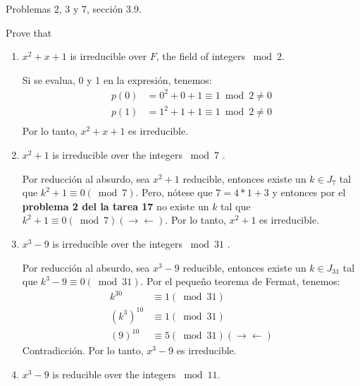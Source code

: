 




Problemas 2, 3 y 7, sección 3.9.

\begin{problema}[Problema 2]
    Prove that
    \begin{enumerate}
        \item $x^2+x+1$ is irreducible over $F$, the field of integers $\bmod 2$.
        \begin{dem}
            Si se evalua, 0 y 1 en la expresión, tenemos: 
            \begin{align*}
                p(0)&= 0^2+0+1 \equiv 1 \bmod 2 \neq 0 \\
                p(1)&= 1^2+1+1 \equiv 1 \bmod 2 \neq 0 \\
            \end{align*}
            Por lo tanto, $x^2+x+1$ es irreducible. 
        \end{dem}
        \item $x^2+1$ is irreducible over the integers $\bmod 7$ .
        \begin{dem}
            Por reducción al absurdo, sea $x^2+1$ reducible, entonces existe un $k\in J_7$ tal que $k^2+1\equiv0(\bmod 7)$. Pero, nótese que $7= 4*1+3$ y entonces por el \textbf{problema 2 del la tarea 17} no existe un $k$ tal que $k^2+1\equiv0(\bmod 7) (\to\gets)$. Por lo tanto, $x^2+1$ es irreducible. 
        \end{dem}
        \item $x^3-9$ is irreducible over the integers $\bmod 31$ .
        \begin{dem}
            Por reducción al absurdo, sea $x^3-9$ reducible, entonces existe un $k\in J_{31}$ tal que $k^3-9\equiv0(\bmod 31)$. Por el pequeño teorema de Fermat, tenemos: 
            \begin{align*}
                k^{30} &\equiv 1 (\bmod 31)\\
                (k^{3})^{10} &\equiv 1 (\bmod 31)\\
                (9)^{10} &\equiv 5 (\bmod 31)(\to\gets)
            \end{align*}
            Contradicción. Por lo tanto, $x^3-9$ es irreducible.
        \end{dem}
        \item $x^3-9$ is reducible over the integers $\bmod 11$.
        \begin{dem}

\end{dem}
\end{enumerate}
\end{problema}
